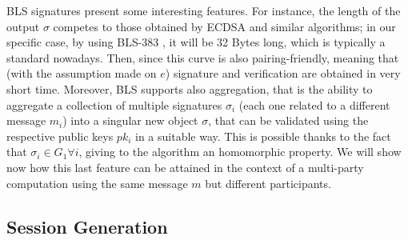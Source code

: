 \documentclass[twocolumn]{article}
\begin{document}
BLS signatures present some interesting features. For instance, the length of the output $\sigma$ competes to those obtained by ECDSA and similar algorithms; in our specific case, by using BLS-383 \citep{bls383}, it will be 32 Bytes long, which is typically a standard nowadays. Then, since this curve is also pairing-friendly, meaning that (with the assumption made on $e$) signature and verification are obtained in very short time. Moreover, BLS supports also aggregation, that is the ability to aggregate a collection of multiple signatures $\sigma_i$ (each one related to a different message $m_i$) into a singular new object $\sigma$, that can be validated using the respective public keys $pk_i$ in a suitable way. This is possible thanks to the fact that $\sigma_i\in G_1 \forall i$, giving to the algorithm an homomorphic property. We will show now how this last feature can be attained in the context of a multi-party computation using the same message $m$ but different participants.

\subsection*{Session Generation}
\end{document}

